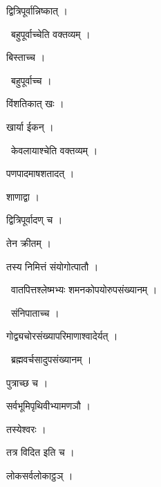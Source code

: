 \documentclass[10pt, openany, oneside]{book}
\begin{document}
\noindent द्वित्रिपूर्वान्निष्कात् ।

\par\noindent\hspace{1.5em}{\vps वा॰}~{\qt बहुपूर्वाच्चेति वक्तव्यम् ।}

\noindent बिस्ताच्च ।

\par\noindent\hspace{1.5em}{\vps वा॰}~{\qt बहुपूर्वाच्च ।}

\noindent विंशतिकात् खः ।

\noindent खार्या ईकन् ।

\par\noindent\hspace{1.5em}{\vps वा॰}~{\qt केवलायाश्चेति वक्तव्यम् ।}

\noindent पणपादमाषशतादत् ।

\noindent शाणाद्वा ।

\noindent द्वित्रिपूर्वादण् च ।

\noindent तेन क्रीतम् ।

\noindent तस्य निमित्तं संयोगोत्पातौ ।

\par\noindent\hspace{1.5em}{\vps वा॰}~{\qt वातपित्तश्लेष्मभ्यः शमनकोपयोरुपसंख्यानम् ।}

\par\noindent\hspace{1.5em}{\vps वा॰}~{\qt संनिपाताच्च ।}

\noindent गोद्व्यचोरसंख्यापरिमाणाश्वादेर्यत् ।

\par\noindent\hspace{1.5em}{\vps वा॰}~{\qt ब्रह्मवर्चसादुपसंख्यानम् ।}

\noindent पुत्राच्छ च ।

\noindent सर्वभूमिपृथिवीभ्यामणञौ ।

\noindent तस्येश्वरः ।

\noindent तत्र विदित इति च ।

\noindent लोकसर्वलोकाट्ठञ् ।
\end{document}
